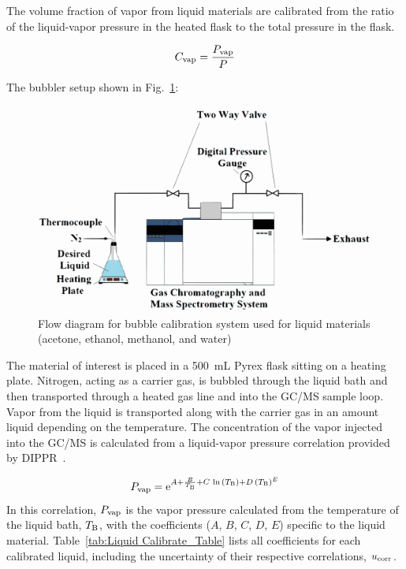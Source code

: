 \documentclass[12pt]{article}
\begin{document}
The volume fraction of vapor from liquid materials are calibrated from the ratio of the liquid-vapor pressure in the heated flask to the total pressure in the flask.

\begin{equation}
\label{eq:liquid_vapor_concentration}
C_{\rm vap} =\frac {P_{\rm vap}}{P}
\end{equation}

The bubbler setup shown in Fig.~\ref{fig:Bubbler}:

\begin{figure}[h!]
	\centering
\includegraphics[width=\textwidth,keepaspectratio]{Bubbler_Setup.png}
	\caption[Flow diagram for bubble calibration system used for liquid materials]{Flow diagram for bubble calibration system used for liquid materials (acetone, ethanol, methanol, and water)}
	\label{fig:Bubbler}
\end{figure}
The material of interest is placed in a 500~mL Pyrex flask sitting on a heating plate. Nitrogen, acting as a carrier gas, is bubbled through the liquid bath and then transported through a heated gas line and into the GC/MS sample loop. Vapor from the liquid is transported along with the carrier gas in an amount liquid depending on the temperature. The concentration of the vapor injected into the GC/MS is calculated from a liquid-vapor pressure correlation provided by DIPPR~\cite{Dippr}.

\begin{equation}
\label{eq:liquid_vapor_pressure_correlation}
P_{\rm vap} ={\rm e}^{A+\frac{B}{T_{\rm B}}+C\,\ln{(T_{\rm B})}+D\,(T_{\rm B})^{E}}
\end{equation}
In this correlation, $P_{\rm vap}$ is the vapor pressure calculated from the temperature of the liquid bath, $T_{\rm B}$, with the coefficients ($A$, $B$, $C$, $D$, $E$) specific to the liquid material. Table~\ref{tab:Liquid Calibrate_Table} lists all coefficients for each calibrated liquid, including the uncertainty of their respective correlations, $u_{\rm corr}$.
\end{document}
